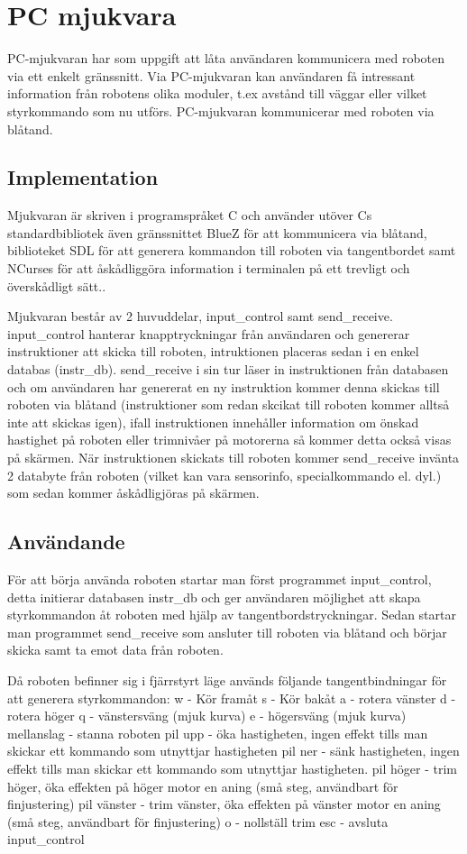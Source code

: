 \section{PC mjukvara}
PC-mjukvaran har som uppgift att låta användaren kommunicera med roboten via ett
enkelt gränssnitt. Via PC-mjukvaran kan användaren få intressant information
från robotens olika moduler, t.ex avstånd till väggar eller vilket styrkommando
som nu utförs. PC-mjukvaran kommunicerar med roboten via blåtand.

\subsection{Implementation}

Mjukvaran är skriven i programspråket C och använder utöver Cs standardbibliotek
även gränssnittet BlueZ för att kommunicera via blåtand, biblioteket SDL för att
generera kommandon till roboten via tangentbordet samt NCurses för att
åskådliggöra information i terminalen på ett trevligt och överskådligt sätt..

Mjukvaran består av 2 huvuddelar, input\_control samt send\_receive. input\_control
hanterar knapptryckningar från användaren och genererar instruktioner att skicka
till roboten, intruktionen placeras sedan i en enkel databas (instr\_db).
send\_receive i sin tur läser in instruktionen från databasen och om användaren
har genererat en ny instruktion kommer denna skickas till roboten via blåtand
(instruktioner som redan skcikat till roboten kommer alltså inte att skickas
 igen), ifall instruktionen innehåller information om önskad hastighet på
roboten eller trimnivåer på motorerna så kommer detta också visas på skärmen.
När instruktionen skickats till roboten kommer send_receive invänta 2 databyte
från roboten (vilket kan vara sensorinfo, specialkommando el. dyl.) som sedan
kommer åskådligjöras på skärmen.
\subsection{Användande}

För att börja använda roboten startar man först programmet input_control, detta
initierar databasen instr\_db och ger användaren möjlighet att skapa
styrkommandon åt roboten med hjälp av tangentbordstryckningar. Sedan startar man
programmet send_receive som ansluter till roboten via blåtand och börjar skicka
samt ta emot data från roboten.

Då roboten befinner sig i fjärrstyrt läge används följande tangentbindningar för
att generera styrkommandon:
w - Kör framåt
s - Kör bakåt
a - rotera vänster
d - rotera höger
q - vänstersväng (mjuk kurva)
e - högersväng (mjuk kurva)
mellanslag - stanna roboten
pil upp - öka hastigheten, ingen effekt tills man skickar ett kommando som
utnyttjar hastigheten
pil ner - sänk hastigheten, ingen effekt tills man skickar ett kommando som
utnyttjar hastigheten.
pil höger - trim höger, öka effekten på höger motor en aning (små steg,
		användbart för finjustering)
pil vänster - trim vänster, öka effekten på vänster motor en aning (små steg,
		användbart för finjustering)
o - nollställ trim
esc - avsluta input\_control

